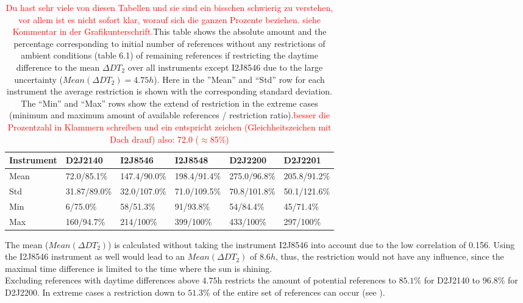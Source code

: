 \begin{table}
	\centering
	\begin{tabular}{|p{1.8cm}|p{2.15cm}|p{2.15cm}|p{2.15cm}|p{2.15cm}|p{2.15cm}|}
		Instrument	&D2J2140&I2J8546& I2J8548&D2J2200&D2J2201\\
		\toprule
		Mean&
		72.0/85.1\% &		147.4/90.0\%&
		198.4/91.4\%&		275.0/96.8\%&
		205.8/91.2\%\\
		\midrule
		Std&		31.87/89.0\%&32.0/107.0\%&
		71.0/109.5\%&		70.8/101.8\%&
		50.1/121.6\% \\
		\midrule
		Min&
		6/75.0\%&		58/51.3\%
		&91/93.8\%		&54/84.4\%
		&45/71.4\%\\
		\midrule
		Max&
		160/94.7\% &
		214/100\% &
		399/100\% &
		433/100\% &
		297/100\% \\
		\bottomrule
	\end{tabular}
	\caption{\textcolor{red}{Du hast sehr viele von diesen Tabellen und sie sind ein bisschen schwierig zu verstehen, vor allem ist es nicht sofort klar, worauf sich die ganzen Prozente beziehen. siehe Kommentar in der Grafikunterschrift.}This table shows the absolute amount and the percentage corresponding to initial number of references without any restrictions of ambient conditions (table 6.1) of remaining references if restricting the daytime difference to the mean $\Delta DT_{2}$ over all instruments except I2J8546 due to the large uncertainty ($Mean(\Delta DT_{2}) = 4.75h$). Here in the ”Mean” and “Std” row for each  instrument the average restriction is shown with the corresponding standard deviation. The “Min” and “Max” rows show the extend of restriction in the extreme cases (minimum and maximum amount of available references / restriction ratio).\textcolor{red}{besser die Prozentzahl in Klammern schreiben und ein entspricht zeichen (Gleichheitszeichen mit Dach drauf) also: 72.0 ($\approx$85\%)}}
	\label{tab:daytimerest}
\end{table}	
The mean ($Mean(\Delta DT_{2})$) is calculated without taking the instrument I2J8546 into account due to the low correlation of 0.156. Using the I2J8546 instrument as well would lead to an  $Mean(\Delta DT_{2})$ of $8.6h$, thus, the restriction would not have any influence, since the maximal time difference is limited to the time where the sun is shining.\\ 
Excluding references with daytime differences above $4.75$h restricts the amount of potential references to $85.1\%$ for D2J2140 to $96.8\%$ for D2J2200. In extreme cases a restriction down to $51.3\%$ of the entire set of references can occur (see ).



